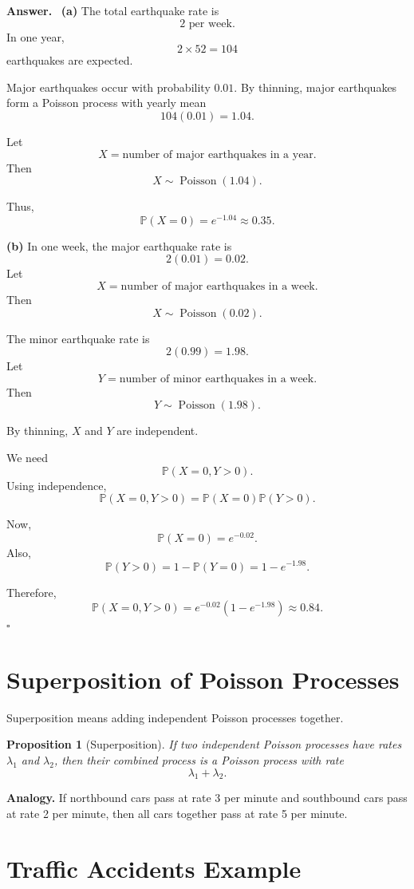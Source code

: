 \documentclass[12pt,a4paper]{article}
\theoremstyle{lecturestyle}
\newtheorem{proposition}{Proposition}
\newenvironment{answer}
{\par\textbf{Answer.}\ }
{\hfill$\square$\par}
\newcommand{\Prob}{\mathbb{P}}
\begin{document}
\begin{answer}
\textbf{(a)} The total earthquake rate is
\[
2\text{ per week}.
\]
In one year,
\[
2\times 52=104
\]
earthquakes are expected.

Major earthquakes occur with probability $0.01$. By thinning, major earthquakes form a Poisson process with yearly mean
\[
104(0.01)=1.04.
\]

Let
\[
X=\text{number of major earthquakes in a year}.
\]
Then
\[
X\sim \operatorname{Poisson}(1.04).
\]

Thus,
\[
\Prob(X=0)=e^{-1.04}\approx 0.35.
\]

\textbf{(b)} In one week, the major earthquake rate is
\[
2(0.01)=0.02.
\]
Let
\[
X=\text{number of major earthquakes in a week}.
\]
Then
\[
X\sim \operatorname{Poisson}(0.02).
\]

The minor earthquake rate is
\[
2(0.99)=1.98.
\]
Let
\[
Y=\text{number of minor earthquakes in a week}.
\]
Then
\[
Y\sim \operatorname{Poisson}(1.98).
\]

By thinning, $X$ and $Y$ are independent.

We need
\[
\Prob(X=0,Y>0).
\]
Using independence,
\[
\Prob(X=0,Y>0)=\Prob(X=0)\Prob(Y>0).
\]

Now,
\[
\Prob(X=0)=e^{-0.02}.
\]
Also,
\[
\Prob(Y>0)=1-\Prob(Y=0)=1-e^{-1.98}.
\]

Therefore,
\[
\Prob(X=0,Y>0)=e^{-0.02}(1-e^{-1.98})\approx 0.84.
\]
\end{answer}

\section{Superposition of Poisson Processes}

Superposition means adding independent Poisson processes together.

\begin{proposition}[Superposition]
If two independent Poisson processes have rates $\lambda_1$ and $\lambda_2$, then their combined process is a Poisson process with rate
\[
\lambda_1+\lambda_2.
\]
\end{proposition}

\textbf{Analogy.} If northbound cars pass at rate 3 per minute and southbound cars pass at rate 2 per minute, then all cars together pass at rate 5 per minute.

\section{Traffic Accidents Example}
\end{document}
